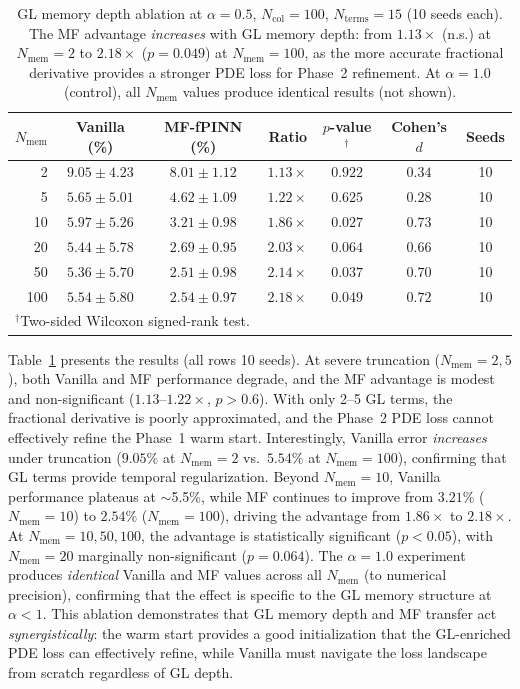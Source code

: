 \documentclass[11pt]{article}
\newcommand{\Ncol}{N_{\mathrm{col}}}
\begin{document}
\begin{table}[t]
\centering
\caption{GL memory depth ablation at $\alpha = 0.5$, $\Ncol = 100$, $N_{\mathrm{terms}} = 15$ (10 seeds each). The MF advantage \emph{increases} with GL memory depth: from $1.13\times$ (n.s.) at $N_{\mathrm{mem}} = 2$ to $2.18\times$ ($p = 0.049$) at $N_{\mathrm{mem}} = 100$, as the more accurate fractional derivative provides a stronger PDE loss for Phase~2 refinement. At $\alpha = 1.0$ (control), all $N_{\mathrm{mem}}$ values produce identical results (not shown).}
\label{tab:gl_ablation}
\begin{tabular}{rcccccc}
\toprule
$N_{\mathrm{mem}}$ & Vanilla (\%) & MF-fPINN (\%) & Ratio & $p$-value$^\dagger$ & Cohen's $d$ & Seeds \\
\midrule
  2 & $9.05 \pm 4.23$ & $8.01 \pm 1.12$ & $1.13\times$ & $0.922$ & $0.34$ & 10 \\
  5 & $5.65 \pm 5.01$ & $4.62 \pm 1.09$ & $1.22\times$ & $0.625$ & $0.28$ & 10 \\
 10 & $5.97 \pm 5.26$ & $3.21 \pm 0.98$ & $\mathbf{1.86\times}$ & $\mathbf{0.027}$ & $0.73$ & 10 \\
 20 & $5.44 \pm 5.78$ & $2.69 \pm 0.95$ & $2.03\times$ & $0.064$ & $0.66$ & 10 \\
 50 & $5.36 \pm 5.70$ & $2.51 \pm 0.98$ & $\mathbf{2.14\times}$ & $\mathbf{0.037}$ & $0.70$ & 10 \\
100 & $5.54 \pm 5.80$ & $2.54 \pm 0.97$ & $\mathbf{2.18\times}$ & $\mathbf{0.049}$ & $0.72$ & 10 \\
\bottomrule
\multicolumn{7}{l}{\small $^\dagger$Two-sided Wilcoxon signed-rank test.} \\
\end{tabular}
\end{table}

Table~\ref{tab:gl_ablation} presents the results (all rows 10 seeds). At severe truncation ($N_{\mathrm{mem}} = 2, 5$), both Vanilla and MF performance degrade, and the MF advantage is modest and non-significant ($1.13$--$1.22\times$, $p > 0.6$). With only 2--5 GL terms, the fractional derivative is poorly approximated, and the Phase~2 PDE loss cannot effectively refine the Phase~1 warm start. Interestingly, Vanilla error \emph{increases} under truncation ($9.05\%$ at $N_{\mathrm{mem}} = 2$ vs.\ $5.54\%$ at $N_{\mathrm{mem}} = 100$), confirming that GL terms provide temporal regularization. Beyond $N_{\mathrm{mem}} = 10$, Vanilla performance plateaus at $\sim$5.5\%, while MF continues to improve from $3.21\%$ ($N_{\mathrm{mem}} = 10$) to $2.54\%$ ($N_{\mathrm{mem}} = 100$), driving the advantage from $1.86\times$ to $2.18\times$. At $N_{\mathrm{mem}} = 10, 50, 100$, the advantage is statistically significant ($p < 0.05$), with $N_{\mathrm{mem}} = 20$ marginally non-significant ($p = 0.064$). The $\alpha = 1.0$ experiment produces \emph{identical} Vanilla and MF values across all $N_{\mathrm{mem}}$ (to numerical precision), confirming that the effect is specific to the GL memory structure at $\alpha < 1$. This ablation demonstrates that GL memory depth and MF transfer act \emph{synergistically}: the warm start provides a good initialization that the GL-enriched PDE loss can effectively refine, while Vanilla must navigate the loss landscape from scratch regardless of GL depth.
\end{document}

